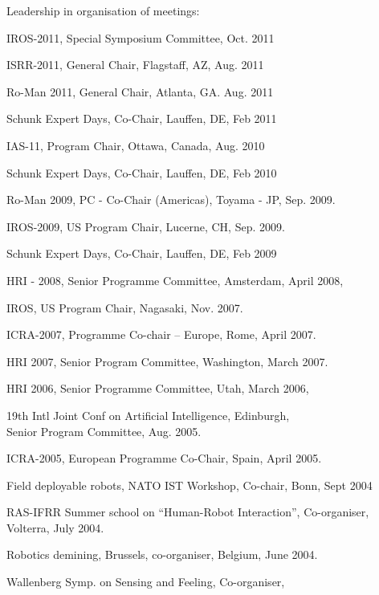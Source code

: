 \documentclass{article}
\begin{document}
\begin{cv}
\begin{cvlist}{Leadership in organisation of meetings:}
\item IROS-2011, Special Symposium Committee, \cftdotfill{\cftdotsep}
  Oct. 2011
\item ISRR-2011, General Chair, Flagstaff, AZ, \cftdotfill{\cftdotsep}
  Aug. 2011
\item Ro-Man 2011, General Chair, Atlanta, GA.
  \cftdotfill{\cftdotsep} Aug. 2011
\item Schunk Expert Days, Co-Chair, Lauffen, DE,
  \cftdotfill{\cftdotsep} Feb 2011
\item IAS-11, Program Chair, Ottawa, Canada, \cftdotfill{\cftdotsep}
  Aug. 2010
\item Schunk Expert Days, Co-Chair, Lauffen, DE,
  \cftdotfill{\cftdotsep} Feb 2010
\item Ro-Man 2009, PC - Co-Chair (Americas), Toyama - JP,
  \cftdotfill{\cftdotsep} Sep.  2009.
\item IROS-2009, US Program Chair, Lucerne, CH,
  \cftdotfill{\cftdotsep} Sep. 2009.
\item Schunk Expert Days, Co-Chair, Lauffen, DE,
  \cftdotfill{\cftdotsep} Feb 2009
\item HRI - 2008, Senior Programme Committee, Amsterdam,
  \cftdotfill{\cftdotsep} April 2008,
\item IROS, US Program Chair, Nagasaki, \cftdotfill{\cftdotsep}
  Nov. 2007.
\item ICRA-2007, Programme Co-chair -- Europe, Rome,
  \cftdotfill{\cftdotsep} April 2007.
\item HRI 2007, Senior Program Committee, Washington,
  \cftdotfill{\cftdotsep} March 2007.
\item HRI 2006, Senior Programme Committee, Utah,
  \cftdotfill{\cftdotsep} March 2006,
\item 19th Intl Joint Conf on Artificial Intelligence,
  Edinburgh,\\ Senior Program Committee, \cftdotfill{\cftdotsep}
  Aug. 2005.
\item ICRA-2005, European Programme Co-Chair, Spain,
  \cftdotfill{\cftdotsep} April 2005.
\item Field deployable robots, NATO IST Workshop, Co-chair, Bonn,
  \cftdotfill{\cftdotsep} Sept 2004
\item RAS-IFRR Summer school on ``Human-Robot Interaction'',
  Co-organiser, \\Volterra, \cftdotfill{\cftdotsep} July 2004.
\item Robotics demining, Brussels, co-organiser, Belgium,
  \cftdotfill{\cftdotsep} June 2004.
\item Wallenberg Symp. on Sensing and Feeling, Co-organiser,

\end{cvlist}
\end{cv}
\end{document}
